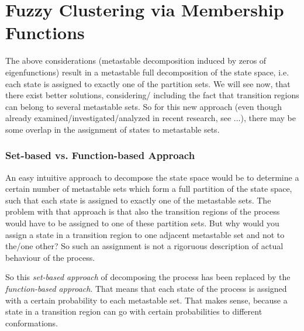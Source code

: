 \section{Fuzzy Clustering via Membership Functions}

The above considerations (metastable decomposition induced by zeros of eigenfunctions) result in a metastable full decomposition of the state space, i.e. each state is assigned to exactly one of the partition sets.
We will see now, that there exist better solutions, considering/ including the fact that transition regions can belong to several metastable sets. So for this new approach (even though already examined/investigated/analyzed in recent research, see  ...), there may be some overlap in the assignment of states to metastable sets.


\subsubsection*{Set-based vs. Function-based Approach}
An easy intuitive approach to decompose the state space would be to determine a certain number of metastable sets which form a full partition of the state space, such that each state is assigned to exactly one of the metastable sets.
The problem with that approach is that also the transition regions of the process would have to be assigned to one of these partition sets. But why would you assign a state in a transition region to one adjacent metastable set and not to the/one other? So such an assignment is not a rigoruous description of actual behaviour of the process.

So this \textit{set-based approach} of decomposing the process has been replaced by the \textit{function-based approach}.
That means that each state of the process is assigned with a certain probability to each metastable set.
That makes sense, because a state in a transition region can go with certain probabilities to different conformations.

